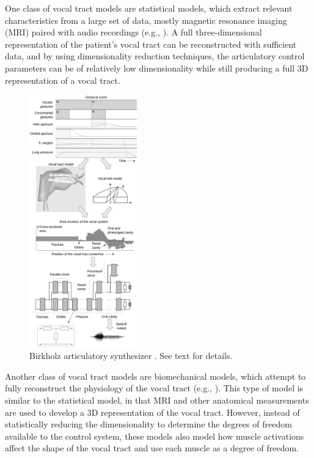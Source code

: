 \documentclass{article}
\begin{document}
One class of vocal tract models
are statistical models,
which extract relevant characteristics
from a large set of data,
mostly magnetic resonance imaging (MRI)
paired with audio recordings
(e.g., \citealp{badin2002}).
A full three-dimensional representation
of the patient's vocal tract
can be reconstructed with sufficient data,
and by using dimensionality reduction techniques,
the articulatory control parameters
can be of relatively low dimensionality
while still producing a full
3D representation of a vocal tract.

\begin{figure}
  \vspace{-30pt}
  \begin{center}
    \includegraphics[width=0.42\textwidth]{birkholz}
  \end{center}
  \vspace{-12pt}
  \caption{Birkholz articulatory synthesizer
    \citep{birkholz2013}. See text for details.}
  \label{fig:birkholz}
  \vspace{-20pt}
\end{figure}

Another class of vocal tract models
are biomechanical models,
which attempt to fully reconstruct
the physiology of the vocal tract
(e.g., \citealp{dang2004}).
This type of model is similar
to the statistical model,
in that MRI and other anatomical measurements
are used to develop a 3D representation
of the vocal tract.
However, instead of statistically
reducing the dimensionality
to determine the degrees of freedom
available to the control system,
these models also model how
muscle activations affect the shape
of the vocal tract
and use each muscle
as a degree of freedom.
\end{document}
